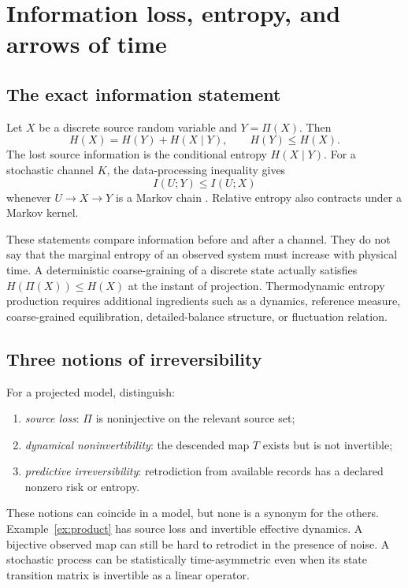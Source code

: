 \documentclass[11pt]{article}
\begin{document}
\section{Information loss, entropy, and arrows of time}

\subsection{The exact information statement}

Let $X$ be a discrete source random variable and $Y=\Pi(X)$.  Then
\[
  H(X)=H(Y)+H(X\mid Y),
  \qquad
  H(Y)\leq H(X).
\]
The lost source information is the conditional entropy $H(X\mid Y)$.
For a stochastic channel $K$, the data-processing inequality gives
\[
  I(U;Y)\leq I(U;X)
\]
whenever $U\to X\to Y$ is a Markov chain
\cite{cover_thomas}.  Relative entropy also contracts under a Markov
kernel.

These statements compare information before and after a channel.  They do
not say that the marginal entropy of an observed system must increase with
physical time.  A deterministic coarse-graining of a discrete state
actually satisfies $H(\Pi(X))\leq H(X)$ at the instant of projection.
Thermodynamic entropy production requires additional ingredients such as a
dynamics, reference measure, coarse-grained equilibration, detailed-balance
structure, or fluctuation relation.

\subsection{Three notions of irreversibility}

\begin{definition}
For a projected model, distinguish:
\begin{enumerate}
\item \emph{source loss}: $\Pi$ is noninjective on the relevant source set;
\item \emph{dynamical noninvertibility}: the descended map $T$ exists but is
not invertible;
\item \emph{predictive irreversibility}: retrodiction from available records
has a declared nonzero risk or entropy.
\end{enumerate}
\end{definition}

These notions can coincide in a model, but none is a synonym for the others.
Example~\ref{ex:product} has source loss and invertible effective dynamics.
A bijective observed map can still be hard to retrodict in the presence of
noise.  A stochastic process can be statistically time-asymmetric even when
its state transition matrix is invertible as a linear operator.
\end{document}
